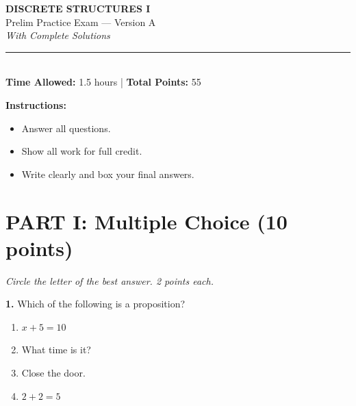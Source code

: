 \documentclass[11pt,a4paper]{article}
\begin{document}
\begin{center}
{\LARGE\textbf{DISCRETE STRUCTURES I}}\\[5pt]
{\Large Prelim Practice Exam --- Version A}\\[5pt]
{\large\textit{With Complete Solutions}}\\[10pt]
\rule{0.8\textwidth}{0.5pt}\\[5pt]
\textbf{Time Allowed:} 1.5 hours \quad | \quad \textbf{Total Points:} 55
\end{center}

\vspace{10pt}

\noindent\textbf{Instructions:}
\begin{itemize}[noitemsep]
    \item Answer all questions.
    \item Show all work for full credit.
    \item Write clearly and box your final answers.
\end{itemize}

\vspace{15pt}

\section*{PART I: Multiple Choice (10 points)}
\textit{Circle the letter of the best answer. 2 points each.}

\vspace{8pt}

\textbf{1.} Which of the following is a proposition?

\begin{enumerate}[label=(\Alph*),noitemsep]
    \item $x + 5 = 10$
    \item What time is it?
    \item Close the door.
    \item $2 + 2 = 5$
\end{enumerate}
\end{document}
